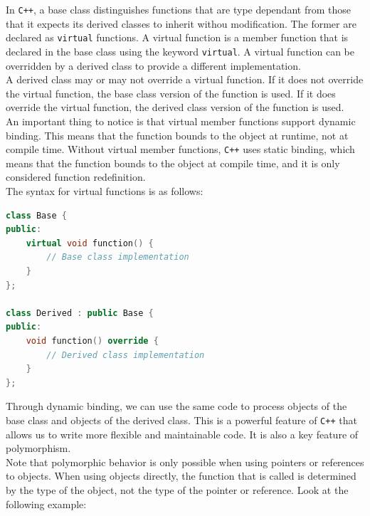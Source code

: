 In \texttt{C++}, a base class distinguishes functions that are type dependant from those that
it expects its derived classes to inherit withou modification. The former are declared as
\texttt{virtual} functions. A virtual function is a member function that is declared in the
base class using the keyword \texttt{virtual}. A virtual function can be overridden by a
derived class to provide a different implementation.\\

A derived class may or may not override a virtual function. If it does not override the
virtual function, the base class version of the function is used. If it does override the
virtual function, the derived class version of the function is used.\\

An important thing to notice is that virtual member functions support dynamic binding. This
means that the function bounds to the object at runtime, not at compile time. Without 
virtual member functions, \texttt{C++} uses static binding, which means that the function
bounds to the object at compile time, and it is only considered function redefinition.\\

The syntax for virtual functions is as follows:\\

\begin{lstlisting}[language=C++]
class Base {
public:
    virtual void function() {
        // Base class implementation
    }
};

class Derived : public Base {
public:
    void function() override {
        // Derived class implementation
    }
};
\end{lstlisting}

Through dynamic binding, we can use the same code to process objects of the base class and
objects of the derived class. This is a powerful feature of \texttt{C++} that allows us to
write more flexible and maintainable code. It is also a key feature of polymorphism.\\

Note that polymorphic behavior is only possible when using pointers or references to objects.
When using objects directly, the function that is called is determined by the type of the
object, not the type of the pointer or reference. Look at the following example:\\

